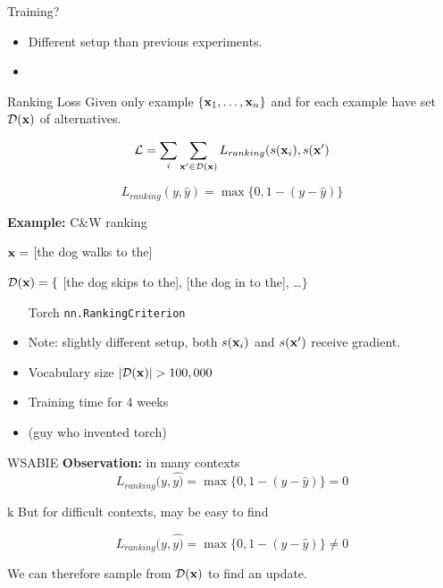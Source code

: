 \documentclass{beamer}
\begin{document}
\begin{frame}{Training?}
  \begin{itemize}
  \item Different setup than previous experiments.

    \air
  \item
  \end{itemize}
\end{frame}


\begin{frame}{Ranking Loss}
  Given only example $\{ \mathbf{x}_1, \ldots, \mathbf{x}_n \}$ and for
  each example have set $\mathcal{D}(\mathbf{x})$ of alternatives.

  \[ \mathcal{L} = \sum_i \sum_{\mathbf{x}' \in \mathcal{D}(\mathbf{x})} L_{ranking}(s(\mathbf{x}_i), s(\mathbf{x}') \]

  \[ L_{ranking}(y, \hat{y}) = \max\{0, 1 - (y - \hat{y}) \}   \]

  \textbf{Example:} C\&W ranking

  $\mathbf{x} =$ [the dog walks to the]

  $\mathcal{D}(\mathbf{x}) = \{$ [the dog skips to the], [the dog in to the], \ldots $\}$

  \begin{itemize}
  \item [Torch \texttt{nn.RankingCriterion}]
    \air
  \item Note: slightly different setup, both $s(\mathbf{x}_i)$ and $s(\mathbf{x}')$ receive gradient.
  \end{itemize}
\end{frame}

\begin{frame}
  \begin{itemize}
  \item Vocabulary size $|\mathcal{D}(\mathbf{x})| > 100,000$
    \air

  \item Training time for 4 weeks
    \air

  \item (guy who invented torch)
  \end{itemize}
\end{frame}

\begin{frame}{WSABIE}
  \textbf{Observation:} in many contexts
  \[ L_{ranking}(y, \hat{y)} = \max\{0, 1 - (y - \hat{y}) \} = 0 \]

  \air
k
  But for difficult contexts, may be easy to find

  \[ L_{ranking}(y, \hat{y)} = \max\{0, 1 - (y - \hat{y}) \} \neq 0 \]

  We can therefore sample from $\mathcal{D}(\mathbf{x})$ to find an update.

\end{frame}
\end{document}
